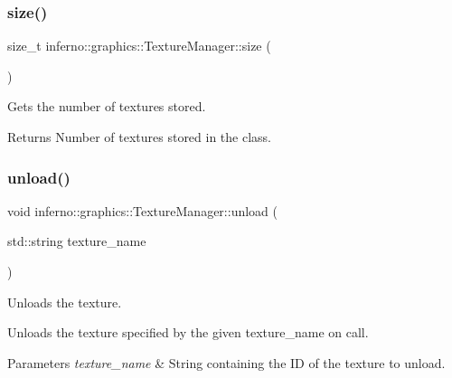\subsubsection{\texorpdfstring{size()}{size()}}
{\footnotesize\ttfamily size\+\_\+t inferno\+::graphics\+::\+Texture\+Manager\+::size (\begin{DoxyParamCaption}{ }\end{DoxyParamCaption})\hspace{0.3cm}{\ttfamily [inline]}}



Gets the number of textures stored. 

\begin{DoxyReturn}{Returns}
Number of textures stored in the class. 
\end{DoxyReturn}
\mbox{\label{classinferno_1_1graphics_1_1_texture_manager_aac47c766334941a083ba67d0644249a7}} 
\subsubsection{\texorpdfstring{unload()}{unload()}}
{\footnotesize\ttfamily void inferno\+::graphics\+::\+Texture\+Manager\+::unload (\begin{DoxyParamCaption}\item[{std\+::string}]{texture\+\_\+name }\end{DoxyParamCaption})}



Unloads the texture. 

Unloads the texture specified by the given texture\+\_\+name on call. 
\begin{DoxyParams}{Parameters}
{\em texture\+\_\+name} & String containing the ID of the texture to unload. \\
\hline
\end{DoxyParams}
\mbox{\label{classinferno_1_1graphics_1_1_texture_manager_a0ff600b700bbc566caeb7055fd26f708}} 
